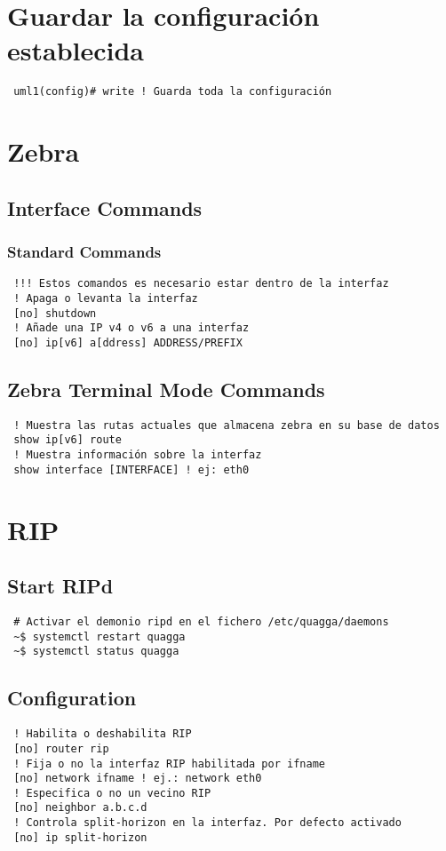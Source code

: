 \documentclass{article}
\begin{document}
\section{Guardar la configuración establecida}
\begin{verbatim}
 uml1(config)# write ! Guarda toda la configuración
\end{verbatim}

\section{Zebra}
\subsection{Interface Commands}
\subsubsection{Standard Commands}
\begin{verbatim}
 !!! Estos comandos es necesario estar dentro de la interfaz
 ! Apaga o levanta la interfaz
 [no] shutdown
 ! Añade una IP v4 o v6 a una interfaz
 [no] ip[v6] a[ddress] ADDRESS/PREFIX
\end{verbatim}

\subsection{Zebra Terminal Mode Commands}
\begin{verbatim}
 ! Muestra las rutas actuales que almacena zebra en su base de datos
 show ip[v6] route
 ! Muestra información sobre la interfaz
 show interface [INTERFACE] ! ej: eth0
\end{verbatim}

\section{RIP}
\subsection{Start RIPd}
\begin{verbatim}
 # Activar el demonio ripd en el fichero /etc/quagga/daemons
 ~$ systemctl restart quagga
 ~$ systemctl status quagga
\end{verbatim}

\subsection{Configuration}
\begin{verbatim}
 ! Habilita o deshabilita RIP
 [no] router rip
 ! Fija o no la interfaz RIP habilitada por ifname
 [no] network ifname ! ej.: network eth0
 ! Especifica o no un vecino RIP
 [no] neighbor a.b.c.d
 ! Controla split-horizon en la interfaz. Por defecto activado
 [no] ip split-horizon
\end{verbatim}
\end{document}
